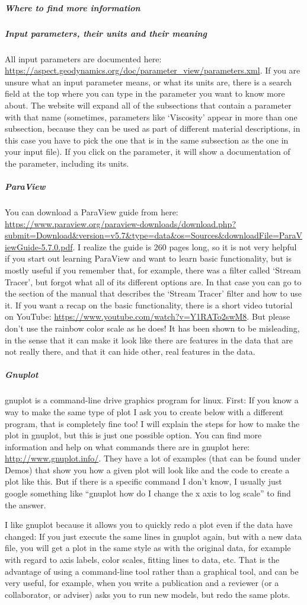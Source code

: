 \subparagraph{Where to find more information}

\subparagraph{Input parameters, their units and their meaning}
All input parameters are documented here: \url{https://aspect.geodynamics.org/doc/parameter_view/parameters.xml}. 
If you are unsure what an input parameter means, or what its units are, there is a search field at the top where you can type in the parameter you want to know more about. The website will expand all of the subsections that contain a parameter with that name (sometimes, parameters like `Viscosity' appear in more than one subsection, because they can be used as part of different material descriptions, in this case you have to pick the one that is in the same subsection as the one in your input file). If you click on the parameter, it will show a documentation of the parameter, including its units. 

\subparagraph{ParaView}
You can download a ParaView guide from here: \url{https://www.paraview.org/paraview-downloads/download.php?submit=Download&version=v5.7&type=data&os=Sources&downloadFile=ParaViewGuide-5.7.0.pdf}. I realize the guide is 260 pages long, so it is not very helpful if you start out learning ParaView and want to learn basic functionality, but is mostly useful if you remember that, for example, there was a filter called `Stream Tracer', but forgot what all of its different options are. In that case you can go to the section of the manual that describes the `Stream Tracer' filter and how to use it. 
If you want a recap on the basic functionality, there is a short video tutorial on YouTube: \url{https://www.youtube.com/watch?v=Y1RATo2swM8}. But please don't use the rainbow color scale as he does! It has been shown to be misleading, in the sense that it can make it look like there are features in the data that are not really there, and that it can hide other, real features in the data. 

\subparagraph{Gnuplot}
gnuplot is a command-line drive graphics program for linux. First: If you know a way to make the same type of plot I ask you to create below with a different program, that is completely fine too! I will explain the steps for how to make the plot in gnuplot, but this is just one possible option. 
You can find more information and help on what commands there are in gnuplot here: \url{http://www.gnuplot.info/}. They have a lot of examples (that can be found under Demos) that show you how a given plot will look like and the code to create a plot like this. 
But if there is a specific command I don't know, I usually just google something like ``gnuplot how do I change the x axis to log scale'' to find the answer. 

I like gnuplot because it allows you to quickly redo a plot even if the data have changed: If you just execute the same lines in gnuplot again, but with a new data file, you will get a plot in the same style as with the original data, for example with regard to axis labels, color scales, fitting lines to data, etc. That is the advantage of using a command-line tool rather than a graphical tool, and can be very useful, for example, when you write a publication and a reviewer (or a collaborator, or adviser) asks you to run new models, but redo the same plots. 
